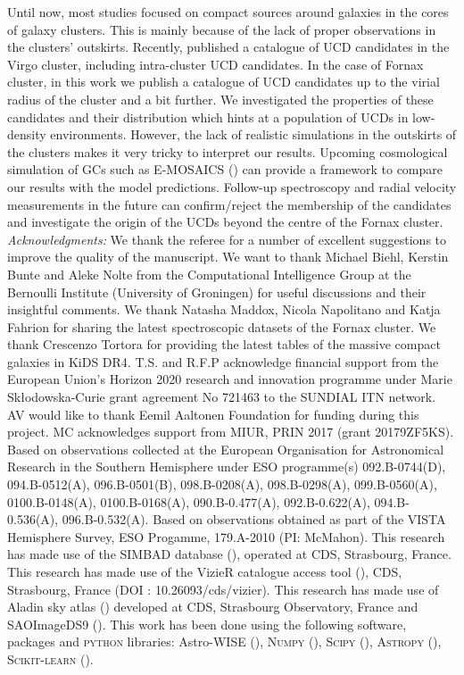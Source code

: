 \documentclass[fleqn,usenatbib]{mnras}
\begin{document}
Until now, most studies focused on compact sources around galaxies in the cores of galaxy clusters. This is mainly because of the lack of proper observations in the clusters’ outskirts. Recently, \citet{Liu-2020} published a catalogue of UCD candidates in the Virgo cluster, including intra-cluster UCD candidates. In the case of Fornax cluster, in this work we publish a catalogue of UCD candidates up to the virial radius of the cluster and a bit further. We investigated the properties of these candidates and their distribution which hints at a population of UCDs in low-density environments. However, the lack of realistic simulations in the outskirts of the clusters makes it very tricky to interpret our results. Upcoming cosmological simulation of GCs such as E-MOSAICS (\citealp{Pfeffer-2018, kuij}) can provide a framework to compare our results with the model predictions. Follow-up spectroscopy and radial velocity measurements in the future can confirm/reject the membership of the candidates and investigate the origin of the UCDs beyond the centre of the Fornax cluster.
\\

\textit{Acknowledgments:} We thank the referee for a number of excellent suggestions to improve the quality of the manuscript.
We want to thank Michael Biehl, Kerstin Bunte and Aleke Nolte from the Computational Intelligence Group at the Bernoulli Institute (University of Groningen) for useful discussions and their insightful comments. We thank Natasha Maddox, Nicola Napolitano and Katja Fahrion for sharing the latest spectroscopic datasets of the Fornax cluster. We thank Crescenzo Tortora for providing the latest tables of the massive compact galaxies in KiDS DR4. T.S. and R.F.P acknowledge financial support from the European Union's Horizon 2020 research and innovation programme under Marie Sk\l odowska-Curie grant agreement No 721463 to the SUNDIAL ITN network. AV would like to thank Eemil Aaltonen Foundation for funding during this project. MC acknowledges support from MIUR, PRIN 2017 (grant 20179ZF5KS). Based on observations collected at the European Organisation for Astronomical Research in the Southern Hemisphere under ESO programme(s) 092.B-0744(D), 094.B-0512(A), 096.B-0501(B), 098.B-0208(A), 098.B-0298(A), 099.B-0560(A), 0100.B-0148(A), 0100.B-0168(A), 090.B-0.477(A), 092.B-0.622(A), 094.B-0.536(A), 096.B-0.532(A). Based on observations obtained as part of the VISTA Hemisphere Survey, ESO Progamme, 179.A-2010 (PI: McMahon). This research has made use of the SIMBAD database (\citealp{simbad}), operated at CDS, Strasbourg, France. This research has made use of the VizieR catalogue access tool (\citealp{vizier}), CDS, Strasbourg, France (DOI : 10.26093/cds/vizier). This research has made use of Aladin sky atlas (\citealp{aladin1,aladin2}) developed at CDS, Strasbourg Observatory, France and SAOImageDS9 (\citealp{ds9}). This work has been done using the following software, packages and \textsc{python} libraries: Astro-WISE (\citealp{aw2,McFarland-2013}), \textsc{Numpy} (\citealp{numpy}), \textsc{Scipy} (\citealp{scipy}), \textsc{Astropy} (\citealp{astropy}), \textsc{Scikit-learn} (\citealp{scikit-learn}).
\end{document}
